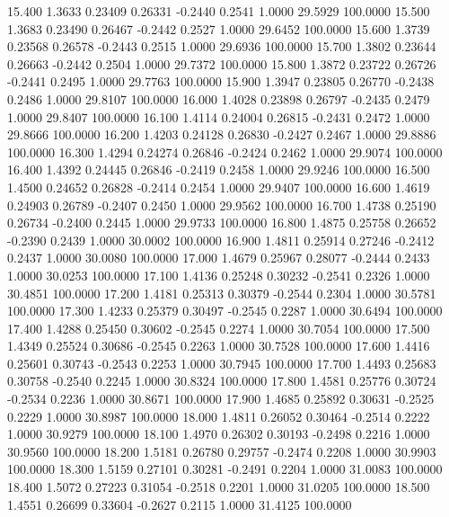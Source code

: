   15.400   1.3633   0.23409   0.26331  -0.2440   0.2541   1.0000  29.5929 100.0000
  15.500   1.3683   0.23490   0.26467  -0.2442   0.2527   1.0000  29.6452 100.0000
  15.600   1.3739   0.23568   0.26578  -0.2443   0.2515   1.0000  29.6936 100.0000
  15.700   1.3802   0.23644   0.26663  -0.2442   0.2504   1.0000  29.7372 100.0000
  15.800   1.3872   0.23722   0.26726  -0.2441   0.2495   1.0000  29.7763 100.0000
  15.900   1.3947   0.23805   0.26770  -0.2438   0.2486   1.0000  29.8107 100.0000
  16.000   1.4028   0.23898   0.26797  -0.2435   0.2479   1.0000  29.8407 100.0000
  16.100   1.4114   0.24004   0.26815  -0.2431   0.2472   1.0000  29.8666 100.0000
  16.200   1.4203   0.24128   0.26830  -0.2427   0.2467   1.0000  29.8886 100.0000
  16.300   1.4294   0.24274   0.26846  -0.2424   0.2462   1.0000  29.9074 100.0000
  16.400   1.4392   0.24445   0.26846  -0.2419   0.2458   1.0000  29.9246 100.0000
  16.500   1.4500   0.24652   0.26828  -0.2414   0.2454   1.0000  29.9407 100.0000
  16.600   1.4619   0.24903   0.26789  -0.2407   0.2450   1.0000  29.9562 100.0000
  16.700   1.4738   0.25190   0.26734  -0.2400   0.2445   1.0000  29.9733 100.0000
  16.800   1.4875   0.25758   0.26652  -0.2390   0.2439   1.0000  30.0002 100.0000
  16.900   1.4811   0.25914   0.27246  -0.2412   0.2437   1.0000  30.0080 100.0000
  17.000   1.4679   0.25967   0.28077  -0.2444   0.2433   1.0000  30.0253 100.0000
  17.100   1.4136   0.25248   0.30232  -0.2541   0.2326   1.0000  30.4851 100.0000
  17.200   1.4181   0.25313   0.30379  -0.2544   0.2304   1.0000  30.5781 100.0000
  17.300   1.4233   0.25379   0.30497  -0.2545   0.2287   1.0000  30.6494 100.0000
  17.400   1.4288   0.25450   0.30602  -0.2545   0.2274   1.0000  30.7054 100.0000
  17.500   1.4349   0.25524   0.30686  -0.2545   0.2263   1.0000  30.7528 100.0000
  17.600   1.4416   0.25601   0.30743  -0.2543   0.2253   1.0000  30.7945 100.0000
  17.700   1.4493   0.25683   0.30758  -0.2540   0.2245   1.0000  30.8324 100.0000
  17.800   1.4581   0.25776   0.30724  -0.2534   0.2236   1.0000  30.8671 100.0000
  17.900   1.4685   0.25892   0.30631  -0.2525   0.2229   1.0000  30.8987 100.0000
  18.000   1.4811   0.26052   0.30464  -0.2514   0.2222   1.0000  30.9279 100.0000
  18.100   1.4970   0.26302   0.30193  -0.2498   0.2216   1.0000  30.9560 100.0000
  18.200   1.5181   0.26780   0.29757  -0.2474   0.2208   1.0000  30.9903 100.0000
  18.300   1.5159   0.27101   0.30281  -0.2491   0.2204   1.0000  31.0083 100.0000
  18.400   1.5072   0.27223   0.31054  -0.2518   0.2201   1.0000  31.0205 100.0000
  18.500   1.4551   0.26699   0.33604  -0.2627   0.2115   1.0000  31.4125 100.0000
